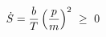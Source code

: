 \documentclass[preview]{standalone}
\begin{document}
\begin{align*}
\special{dvisvgm:raw <g id='unique000'>}\dot S=\frac bT\left(\frac pm\right)^2\ \ge\ 0\special{dvisvgm:raw </g>}
\end{align*}
\end{document}
